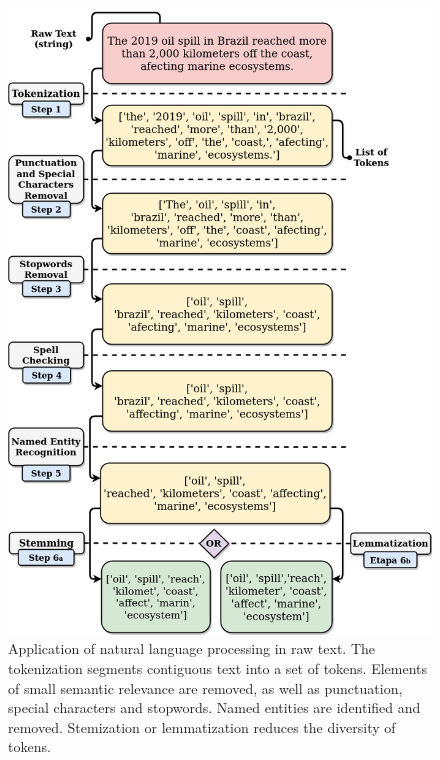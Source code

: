 \documentclass{ieeeaccess}
\begin{document}

\begin{figure}[tb!]
	\centering
	\includegraphics[width=1\columnwidth]{../minicurso/nlp_schema_layers_2.png}
	\vspace{4mm}
	\caption{Application of natural language processing in raw text. The tokenization segments contiguous text into a set of tokens. Elements of small semantic relevance are removed, as well as punctuation, special characters and stopwords. Named entities are identified and removed. Stemization or lemmatization reduces the diversity of tokens.}
	\label{fig:esquema_nlp}
\end{figure}
\end{document}
